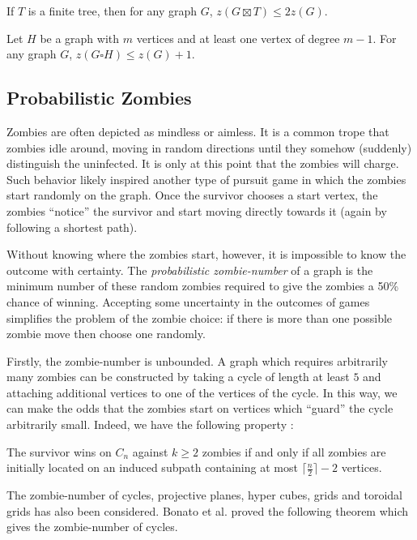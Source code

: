 \begin{theorem}
If $T$ is a finite tree, then for any graph $G$, $z ( G \boxtimes T ) \leq 2 z ( G )$.
\end{theorem}

\begin{theorem}
Let $H$ be a graph with $m$ vertices and at least one vertex of degree $m - 1$. For any graph $G$, $z ( G \square H ) \leq z ( G ) + 1$.
\end{theorem}


\subsection{Probabilistic Zombies}\label{subsection intro probabilistic}

Zombies are often depicted as mindless or aimless. It is a common trope that zombies
idle around, moving in random directions until they somehow (suddenly) distinguish
the uninfected. It is only at this point that the zombies will charge.
Such behavior likely inspired another type of pursuit game \cite{bonato2016probabilistic} in which the zombies start randomly on the graph. Once the survivor chooses a start vertex, the zombies ``notice'' the survivor and start moving directly towards it (again by following a shortest path).

Without knowing where the zombies start, however, it is impossible to know the outcome with certainty.
The \textit{probabilistic zombie-number} of a graph is the minimum number of these random zombies required to give the zombies a 50\% chance of winning. Accepting some uncertainty in the outcomes of games simplifies the problem of the zombie choice: if there is more than one possible zombie move then choose one randomly.

Firstly, the zombie-number is unbounded. A graph which requires arbitrarily many zombies can be constructed by taking a cycle of length at least $5$ and attaching additional vertices to one of the vertices of the cycle. In this way, we can make the odds that the zombies start on vertices which ``guard'' the cycle arbitrarily small. Indeed, we have the following property \cite{bonato2016probabilistic}:
\begin{lemma}
The survivor wins on $C_n$ against $k \geq 2$ zombies if and only if all zombies are initially located on an induced subpath containing at most $\lceil\frac{n}{2}\rceil-2$ vertices. \label{lemma subpath}
\end{lemma}

The zombie-number of cycles, projective planes, hyper cubes, grids and toroidal grids has also been considered. Bonato et al. proved the following theorem \cite{bonato2016probabilistic} which gives the zombie-number of cycles.

